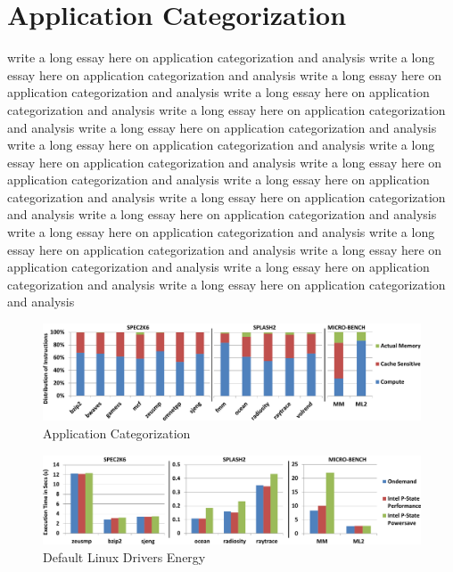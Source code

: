 \section{Application Categorization}\label{sec:appl}


write a long essay here on application categorization and analysis
write a long essay here on application categorization and analysis
write a long essay here on application categorization and analysis
write a long essay here on application categorization and analysis
write a long essay here on application categorization and analysis
write a long essay here on application categorization and analysis
write a long essay here on application categorization and analysis
write a long essay here on application categorization and analysis
write a long essay here on application categorization and analysis
write a long essay here on application categorization and analysis
write a long essay here on application categorization and analysis
write a long essay here on application categorization and analysis
write a long essay here on application categorization and analysis
write a long essay here on application categorization and analysis
write a long essay here on application categorization and analysis
write a long essay here on application categorization and analysis
write a long essay here on application categorization and analysis







\begin{figure}
  \begin{center}
    \includegraphics[width=\linewidth]{figs/app-cat-crop.pdf}
  \end{center}
  \vspace{-0.05in}
  \caption{Application Categorization}
  \vspace{-0.04in}
  \label{fig:appl-cat}
\end{figure}


\begin{figure}
  \begin{center}
\includegraphics[width=\linewidth]{figs/def-exec-time-crop.pdf}
  \end{center}
  \vspace{-0.1in}
  \caption{Default Linux Drivers Energy}
  \label{fig:sched-results}
\end{figure}



